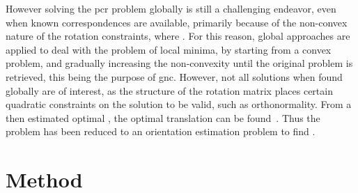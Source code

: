 However solving the \gls{pcr} problem globally is still a challenging endeavor, even when known correspondences are available, primarily because of the non-convex nature of the rotation constraints, where . For this reason, global approaches are applied to deal with the problem of local minima, by starting from a convex problem, and gradually increasing the non-convexity until the original problem is retrieved, this being the purpose of \gls{gnc}. However, not all solutions when found globally are of interest, as the structure of the rotation matrix places certain quadratic constraints on the solution to be valid, such as orthonormality. From a then estimated optimal , the optimal translation  can be found~\cite{convex-global-3d-registration-with-lagrangian-duality}. Thus the problem has been reduced to an orientation estimation problem to find \tf[R]{\star}{}.

\section{Method} \label{sec:2-pose-estimation-method}






